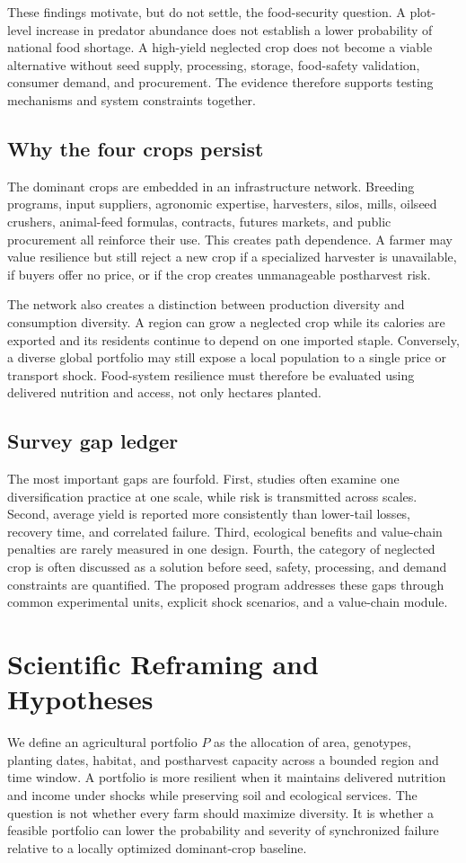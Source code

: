 \documentclass[conference]{IEEEtran}
\begin{document}
These findings motivate, but do not settle, the food-security question. A plot-level increase in predator abundance does not establish a lower probability of national food shortage. A high-yield neglected crop does not become a viable alternative without seed supply, processing, storage, food-safety validation, consumer demand, and procurement. The evidence therefore supports testing mechanisms and system constraints together.

\subsection{Why the four crops persist}
The dominant crops are embedded in an infrastructure network. Breeding programs, input suppliers, agronomic expertise, harvesters, silos, mills, oilseed crushers, animal-feed formulas, contracts, futures markets, and public procurement all reinforce their use. This creates path dependence. A farmer may value resilience but still reject a new crop if a specialized harvester is unavailable, if buyers offer no price, or if the crop creates unmanageable postharvest risk.

The network also creates a distinction between production diversity and consumption diversity. A region can grow a neglected crop while its calories are exported and its residents continue to depend on one imported staple. Conversely, a diverse global portfolio may still expose a local population to a single price or transport shock. Food-system resilience must therefore be evaluated using delivered nutrition and access, not only hectares planted.

\subsection{Survey gap ledger}
The most important gaps are fourfold. First, studies often examine one diversification practice at one scale, while risk is transmitted across scales. Second, average yield is reported more consistently than lower-tail losses, recovery time, and correlated failure. Third, ecological benefits and value-chain penalties are rarely measured in one design. Fourth, the category of neglected crop is often discussed as a solution before seed, safety, processing, and demand constraints are quantified. The proposed program addresses these gaps through common experimental units, explicit shock scenarios, and a value-chain module.

\section{Scientific Reframing and Hypotheses}
\label{sec:hyp}
We define an agricultural portfolio $P$ as the allocation of area, genotypes, planting dates, habitat, and postharvest capacity across a bounded region and time window. A portfolio is more resilient when it maintains delivered nutrition and income under shocks while preserving soil and ecological services. The question is not whether every farm should maximize diversity. It is whether a feasible portfolio can lower the probability and severity of synchronized failure relative to a locally optimized dominant-crop baseline.
\end{document}
